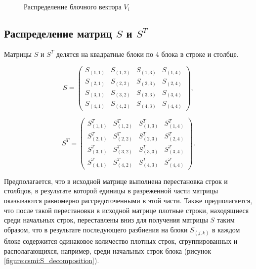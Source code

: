 \begin{figure}
	\caption{Распределение блочного вектора $V_i$}
	\label{figure:csmi:V_distribution}
\end{figure}

\subsection{Распределение матриц $S$ и $S^T$}

Матрицы $S$ и $S^T$ делятся на квадратные блоки по 4 блока в строке и столбце.

$$
	S
	=
	\begin{pmatrix}
		S_{(1,1)} & S_{(1,2)} & S_{(1,3)} & S_{(1,4)} \\
		S_{(2,1)} & S_{(2,2)} & S_{(2,3)} & S_{(2,4)} \\
		S_{(3,1)} & S_{(3,2)} & S_{(3,3)} & S_{(3,4)} \\
		S_{(4,1)} & S_{(4,2)} & S_{(4,3)} & S_{(4,4)}
	\end{pmatrix}
	,
$$

$$
	S^T
	=
	\begin{pmatrix}
		S^T_{(1,1)} & S^T_{(1,2)} & S^T_{(1,3)} & S^T_{(1,4)} \\
		S^T_{(2,1)} & S^T_{(2,2)} & S^T_{(2,3)} & S^T_{(2,4)} \\
		S^T_{(3,1)} & S^T_{(3,2)} & S^T_{(3,3)} & S^T_{(3,4)} \\
		S^T_{(4,1)} & S^T_{(4,2)} & S^T_{(4,3)} & S^T_{(4,4)}
	\end{pmatrix}
	.
$$

Предполагается, что в исходной матрице выполнена перестановка строк и столбцов, в результате которой единицы в разреженной части матрицы оказываются равномерно рассредоточенными
в этой части. Также предполагается, что после такой перестановки в исходной матрице плотные строки, находящиеся среди начальных строк, переставлены вниз
для получения матрицы $S$ таким образом, что в результате последующего разбиения на блоки $S_{(j,k)}$ в каждом блоке содержится одинаковое количество плотных строк,
сгруппированных и располагающихся, например, среди начальных строк блока (рисунок \ref{figure:csmi:S_decomposition}).

